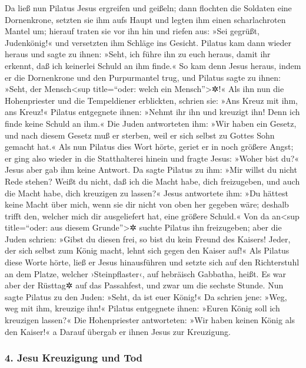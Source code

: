  Da ließ nun Pilatus Jesus ergreifen und geißeln;
 dann flochten die Soldaten eine Dornenkrone, setzten sie
ihm aufs Haupt und legten ihm einen scharlachroten Mantel um;
 hierauf traten sie vor ihn hin und riefen aus: »Sei
gegrüßt, Judenkönig!« und versetzten ihm Schläge ins Gesicht.
 Pilatus kam dann wieder heraus und sagte zu ihnen: »Seht,
ich führe ihn zu euch heraus, damit ihr erkennt, daß ich keinerlei
Schuld an ihm finde.«  So kam denn Jesus heraus, indem er
die Dornenkrone und den Purpurmantel trug, und Pilatus sagte zu ihnen:
»Seht, der Mensch\textless sup title=``oder: welch ein
Mensch''\textgreater✲!«  Als ihn nun die Hohenpriester und
die Tempeldiener erblickten, schrien sie: »Ans Kreuz mit ihm, ans
Kreuz!« Pilatus entgegnete ihnen: »Nehmt ihr ihn und kreuzigt ihn! Denn
ich finde keine Schuld an ihm.«  Die Juden antworteten
ihm: »Wir haben ein Gesetz, und nach diesem Gesetz muß er sterben, weil
er sich selbst zu Gottes Sohn gemacht hat.«  Als nun
Pilatus dies Wort hörte, geriet er in noch größere Angst; 
er ging also wieder in die Statthalterei hinein und fragte Jesus: »Woher
bist du?« Jesus aber gab ihm keine Antwort.  Da sagte
Pilatus zu ihm: »Mir willst du nicht Rede stehen? Weißt du nicht, daß
ich die Macht habe, dich freizugeben, und auch die Macht habe, dich
kreuzigen zu lassen?«  Jesus antwortete ihm: »Du hättest
keine Macht über mich, wenn sie dir nicht von oben her gegeben wäre;
deshalb trifft den, welcher mich dir ausgeliefert hat, eine größere
Schuld.«  Von da an\textless sup title=``oder: aus diesem
Grunde''\textgreater✲ suchte Pilatus ihn freizugeben; aber die Juden
schrien: »Gibst du diesen frei, so bist du kein Freund des Kaisers!
Jeder, der sich selbst zum König macht, lehnt sich gegen den Kaiser
auf!«  Als Pilatus diese Worte hörte, ließ er Jesus
hinausführen und setzte sich auf den Richterstuhl an dem Platze, welcher
›Steinpflaster‹, auf hebräisch Gabbatha, heißt.  Es war
aber der Rüsttag✲ auf das Passahfest, und zwar um die sechste Stunde.
Nun sagte Pilatus zu den Juden: »Seht, da ist euer König!«
 Da schrien jene: »Weg, weg mit ihm, kreuzige ihn!«
Pilatus entgegnete ihnen: »Euren König soll ich kreuzigen lassen?« Die
Hohenpriester antworteten: »Wir haben keinen König als den Kaiser!«
 a Darauf übergab er ihnen Jesus zur Kreuzigung.

\hypertarget{jesu-kreuzigung-und-tod}{%
\subsubsection{4. Jesu Kreuzigung und
Tod}\label{jesu-kreuzigung-und-tod}}

